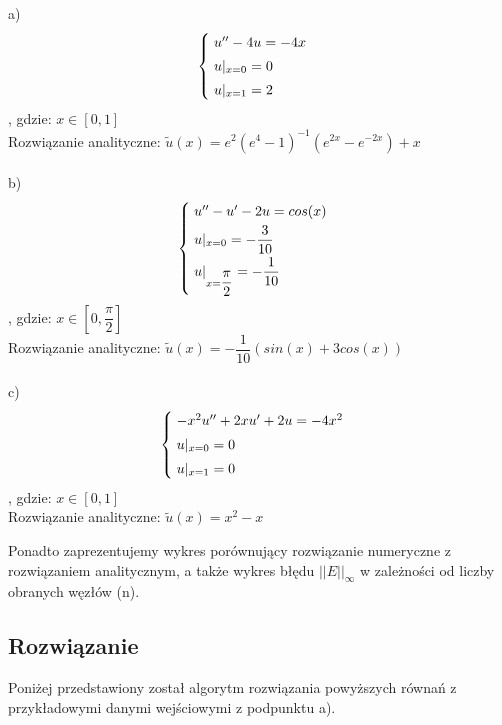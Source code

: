 a)
\[
\begin{cases}
\vspace{0.1cm} 
\hspace{0,1cm} u'' - 4u =-4x \\
\vspace{0.1cm}
\hspace{0,1cm}u|_{x=0} = 0 \\
\hspace{0,1cm}u|_{x=1} = 2
\end{cases}
\]
, gdzie:
$x\in[0,1]$
\\
Rozwiązanie analityczne: $\widetilde{u}(x) = e^2(e^4-1)^{-1} (e^{2x} - e^{-2x}) + x$
\\
\\
b)
\[
\begin{cases}
\vspace{0.1cm} 
\hspace{0,1cm} u'' -u'- 2u =cos(x) \\
\vspace{0.1cm}
\hspace{0,1cm}u|_{x=0} = -\dfrac{3}{10} \\
\hspace{0,1cm}u|_{x=\dfrac{\pi}{2}} = -\dfrac{1}{10}
\end{cases}
\]
, gdzie:
$x\in[0, \dfrac{\pi}{2}]$
\\
Rozwiązanie analityczne: $\widetilde{u}(x) = -\dfrac{1}{10}(sin(x) + 3cos(x))$
\\
\\
c)
\[
\begin{cases}
\vspace{0.1cm} 
\hspace{0,1cm} -x^2u'' +2xu' +2u=-4x^2 \\
\vspace{0.1cm}
\hspace{0,1cm}u|_{x=0} = 0 \\
\hspace{0,1cm}u|_{x=1} = 0
\end{cases}
\]
, gdzie:
$x\in[0,1]$
\\
Rozwiązanie analityczne: $\widetilde{u}(x) = x^2 - x$

\vspace{0.3cm}
Ponadto zaprezentujemy wykres porównujący rozwiązanie numeryczne z rozwiązaniem analitycznym, a także wykres błędu $||E||_{\infty}$ w zależności od liczby obranych węzłów (n).
\newpage
\subsection{Rozwiązanie}
Poniżej przedstawiony został algorytm rozwiązania powyższych równań z przykładowymi danymi wejściowymi z podpunktu a).


